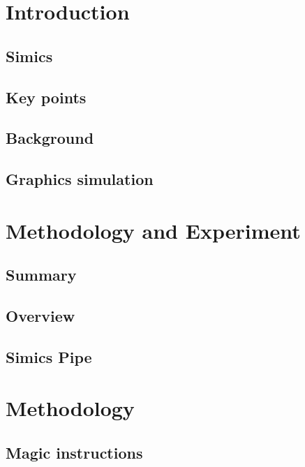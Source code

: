 \documentclass{beamer}
\begin{document}
	

	\section{Introduction}

	\subsection{Simics}
	

	\subsection{Key points}
	

        \subsection{Background}
        

	\subsection{Graphics simulation}
	

        \section{Methodology and Experiment}

        \subsection{Summary}
	

	\subsection{Overview}
	

	\subsection{Simics Pipe}
	

	\section{Methodology}
	\subsection{Magic instructions}
	
\end{document}
